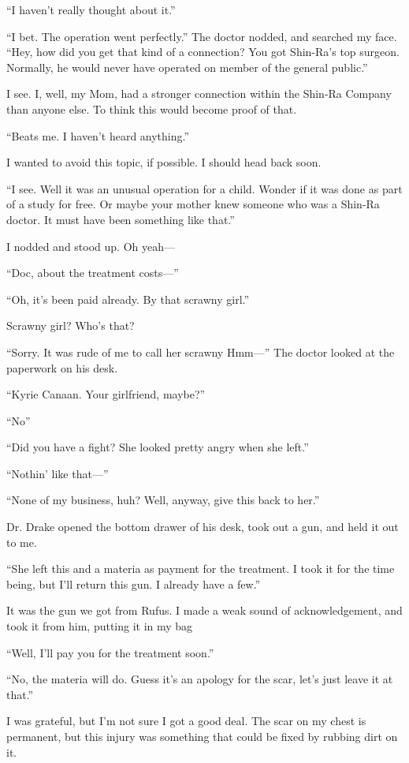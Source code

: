 \documentclass[oneside]{book}
\begin{document}
“I haven’t really thought about it.”

“I bet. The operation went perfectly.” The doctor nodded, and searched my face. “Hey, how did you get that kind of a connection? You got Shin-Ra’s top surgeon. Normally, he would never have operated on member of the general public.”

I see. I, well, my Mom, had a stronger connection within the Shin-Ra Company than anyone else. To think this would become proof of that.

“Beats me. I haven’t heard anything.”

I wanted to avoid this topic, if possible. I should head back soon.

“I see. Well it was an unusual operation for a child. Wonder if it was done as part of a study for free. Or maybe your mother knew someone who was a Shin-Ra doctor. It must have been something like that.”

I nodded and stood up. Oh yeah—

“Doc, about the treatment costs—”

“Oh, it’s been paid already. By that scrawny girl.”

Scrawny girl? Who’s that?

“Sorry. It was rude of me to call her scrawny Hmm—” The doctor looked at the paperwork on his desk.

“Kyrie Canaan. Your girlfriend, maybe?”

“No”

“Did you have a fight? She looked pretty angry when she left.”

“Nothin’ like that—”

“None of my business, huh? Well, anyway, give this back to her.”

Dr. Drake opened the bottom drawer of his desk, took out a gun, and held it out to me.

“She left this and a materia as payment for the treatment. I took it for the time being, but I’ll return this gun. I already have a few.”

It was the gun we got from Rufus. I made a weak sound of acknowledgement, and took it from him, putting it in my bag

“Well, I’ll pay you for the treatment soon.”

“No, the materia will do. Guess it’s an apology for the scar, let’s just leave it at that.”

I was grateful, but I’m not sure I got a good deal. The scar on my chest is permanent, but this injury was something that could be fixed by rubbing dirt on it.
\end{document}
